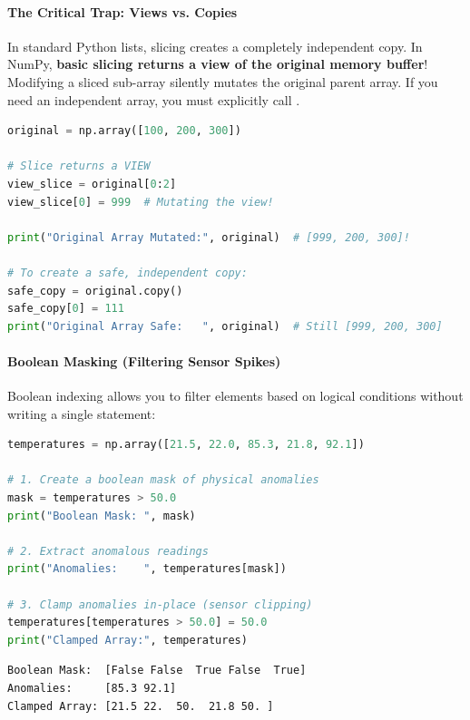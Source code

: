 \paragraph{The Critical Trap: Views vs. Copies}
\begin{warning}
In standard Python lists, slicing creates a completely independent copy. In NumPy, \textbf{basic slicing returns a view of the original memory buffer}! Modifying a sliced sub-array silently mutates the original parent array. If you need an independent array, you must explicitly call .
\end{warning}

\begin{lstlisting}[language=Python]
original = np.array([100, 200, 300])

# Slice returns a VIEW
view_slice = original[0:2]
view_slice[0] = 999  # Mutating the view!

print("Original Array Mutated:", original)  # [999, 200, 300]!

# To create a safe, independent copy:
safe_copy = original.copy()
safe_copy[0] = 111
print("Original Array Safe:   ", original)  # Still [999, 200, 300]
\end{lstlisting}

\paragraph{Boolean Masking (Filtering Sensor Spikes)}
Boolean indexing allows you to filter elements based on logical conditions without writing a single  statement:

\begin{lstlisting}[language=Python]
temperatures = np.array([21.5, 22.0, 85.3, 21.8, 92.1])

# 1. Create a boolean mask of physical anomalies
mask = temperatures > 50.0
print("Boolean Mask: ", mask)

# 2. Extract anomalous readings
print("Anomalies:    ", temperatures[mask])

# 3. Clamp anomalies in-place (sensor clipping)
temperatures[temperatures > 50.0] = 50.0
print("Clamped Array:", temperatures)
\end{lstlisting}

\begin{lstlisting}[style=outputstyle]
Boolean Mask:  [False False  True False  True]
Anomalies:     [85.3 92.1]
Clamped Array: [21.5 22.  50.  21.8 50. ]
\end{lstlisting}

